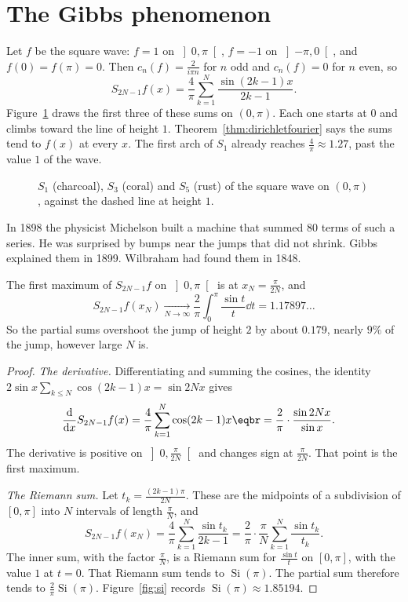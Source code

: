 \section{The Gibbs phenomenon}

Let $f$ be the square wave: $f=1$ on $\left]0,\pi\right[$, $f=-1$ on $\left]-\pi,0\right[$, and $f(0)=f(\pi)=0$. Then $c_n(f)=\frac2{i\pi n}$ for $n$ odd and $c_n(f)=0$ for $n$ even, so
\[
S_{2N-1}f(x)=\frac4\pi\sum_{k=1}^N\frac{\sin(2k-1)x}{2k-1}.
\]
Figure~\ref{fig:rw06-square} draws the first three of these sums on $(0,\pi)$. Each one starts at $0$ and climbs toward the line of height $1$. Theorem~\ref{thm:dirichletfourier} says the sums tend to $f(x)$ at every $x$. The first arch of $S_1$ already reaches $\frac4\pi\approx1.27$, past the value $1$ of the wave.

\begin{figure}[ht]
\centering
{}
\caption{$S_1$ (charcoal), $S_3$ (coral) and $S_5$ (rust) of the square wave on $(0,\pi)$, against the dashed line at height $1$.}
\label{fig:rw06-square}
\end{figure}

In 1898 the physicist Michelson built a machine that summed $80$ terms of such a series. He was surprised by bumps near the jumps that did not shrink. Gibbs explained them in 1899. Wilbraham had found them in 1848.

\begin{theorem}\label{thm:gibbs}
The first maximum of $S_{2N-1}f$ on $\left]0,\pi\right[$ is at $x_N=\frac\pi{2N}$, and
\[
S_{2N-1}f(x_N)\xrightarrow[N\to\infty]{}\frac2\pi\int_0^\pi\frac{\sin t}t\dd t=1.17897\ldots
\]
So the partial sums overshoot the jump of height $2$ by about $0.179$, nearly $9\%$ of the jump, however large $N$ is.
\end{theorem}
\begin{proof}
\emph{The derivative.} Differentiating and summing the cosines, the identity $2\sin x\sum_{k\le N}\cos(2k-1)x=\sin 2Nx$ gives
\[
\begin{aligned}\frac{\mathrm d}{\mathrm dx}S_{2N-1}f(x)&=\frac4\pi\sum_{k=1}^N\cos(2k-1)x\eqbr=\frac2\pi\cdot\frac{\sin2Nx}{\sin x}.\end{aligned}
\]
The derivative is positive on $\left]0,\frac\pi{2N}\right[$ and changes sign at $\frac\pi{2N}$. That point is the first maximum.

\emph{The Riemann sum.} Let $t_k=\frac{(2k-1)\pi}{2N}$. These are the midpoints of a subdivision of $[0,\pi]$ into $N$ intervals of length $\frac\pi N$, and
\[
S_{2N-1}f(x_N)=\frac4\pi\sum_{k=1}^N\frac{\sin t_k}{2k-1}=\frac2\pi\cdot\frac\pi N\sum_{k=1}^N\frac{\sin t_k}{t_k}.
\]
The inner sum, with the factor $\frac\pi N$, is a Riemann sum for $\frac{\sin t}t$ on $[0,\pi]$, with the value $1$ at $t=0$. That Riemann sum tends to $\operatorname{Si}(\pi)$. The partial sum therefore tends to $\frac2\pi\operatorname{Si}(\pi)$. Figure~\ref{fig:si} records $\operatorname{Si}(\pi)\approx1.85194$.
\end{proof}

